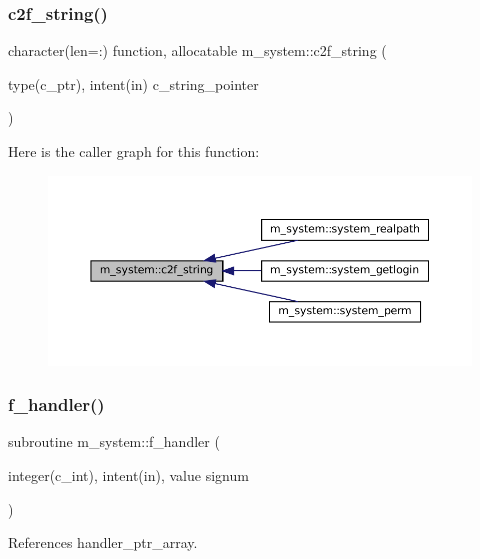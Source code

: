 \subsubsection{\texorpdfstring{c2f\+\_\+string()}{c2f\_string()}}
{\footnotesize\ttfamily character(len=\+:) function, allocatable m\+\_\+system\+::c2f\+\_\+string (\begin{DoxyParamCaption}\item[{type(c\+\_\+ptr), intent(in)}]{c\+\_\+string\+\_\+pointer }\end{DoxyParamCaption})\hspace{0.3cm}{\ttfamily [private]}}

Here is the caller graph for this function\+:
\nopagebreak
\begin{figure}[H]
\begin{center}
\leavevmode
\includegraphics[width=350pt]{namespacem__system_aa7c5445619aa15cd2301fe17f7c3b73c_icgraph}
\end{center}
\end{figure}
\mbox{\label{namespacem__system_a078c9adfb12b36e88534248e99ed9fcc}} 
\subsubsection{\texorpdfstring{f\+\_\+handler()}{f\_handler()}}
{\footnotesize\ttfamily subroutine m\+\_\+system\+::f\+\_\+handler (\begin{DoxyParamCaption}\item[{integer(c\+\_\+int), intent(in), value}]{signum }\end{DoxyParamCaption})\hspace{0.3cm}{\ttfamily [private]}}



References handler\+\_\+ptr\+\_\+array.

